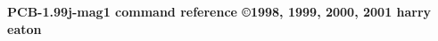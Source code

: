 %
%
%
%
%



%

\textwidth 27.16cm   \hsize\textwidth
\textheight 18.46cm  \vsize\textheight
\voffset -0.2in
\hoffset -0.5in

\topmargin 0cm
\headheight 0cm
\headsep 0cm
\topskip 0cm
\footskip 0cm
\footheight 1cm
\oddsidemargin 0cm
\evensidemargin 0cm
\marginparwidth 0cm

%
\def\BoxWidth{8.7cm}
\def\BoxHeight{15cm}
\def\BoxRaise{-\BoxHeight}

%
\newcommand{\Shift}{{\it [S]}}
\newcommand{\Ctrl}{{\it [C]}}
\newcommand{\Mod}{{\it [M]}}
\newcommand{\Btn}{{\it Btn}}
\newcommand{\Fun}{{\it F}}

\thispagestyle{empty}



\centerline{\Huge\bf PCB-1.99j-mag1 command reference
{\scriptsize \copyright 1998, 1999, 2000, 2001 harry eaton}}
\bigskip
\small

